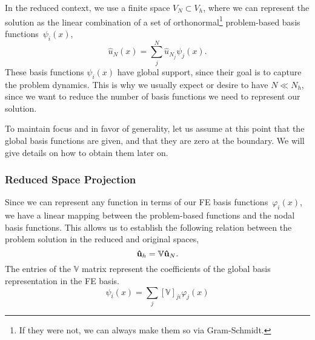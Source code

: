 \documentclass[../1_heat_equation.tex]{subfiles}
\newcommand{\rbV}{\ensuremath{\mathbb{V}}}
\begin{document}
In the reduced context, we use a finite space $V_N \subset V_h$, where we can represent the solution as the linear combination of a set of orthonormal\footnote{If they were not, we can always make them so via Gram-Schmidt.} problem-based basis functions~$\psi_i(x)$,
\begin{equation}
    \label{eq:1d_rom_heat_equation_rb_expansion}
    \hat{u}_N(x) = \sum_j^{N} \hat{u}_{N_j} \psi_j(x).
\end{equation}
These basis functions $\psi_i(x)$ have global support, since their goal is to capture the problem dynamics. 
This is why we usually expect or desire to have $N \ll N_h$, since we want to reduce the number of basis functions we need to represent our solution. 

To maintain focus and in favor of generality, let us assume at this point that the global basis functions are given, and that they are zero at the boundary.
We will give details on how to obtain them later on.

\subsubsection{Reduced Space Projection}
Since we can represent any function in terms of our FE basis functions~$\varphi_i(x)$, 
we have a linear mapping between the problem-based functions and the nodal basis functions.
This allows us to establish the following relation between the problem solution in the reduced and original spaces,
\begin{equation}
    \label{eq:1d_rom_heat_equation_projection_relation}
    \vb{\hat{u}}_h = \rbV \vb{\hat{u}}_N.
\end{equation}
The entries of the $\rbV$ matrix represent the coefficients of the global basis representation in the FE basis. 
\begin{equation}
    \psi_i(x) = \sum_j \left[\mathbb{V}\right]_{ji}\varphi_j(x) 
\end{equation}
\end{document}
